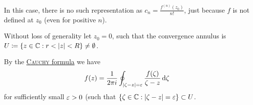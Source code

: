 \documentclass[a4paper,english]{article}
\begin{document}
\begin{remark}
    In this case, there is no such representation as $c_n = \frac{f^{(n)}(z_0)}{n!}$, just because $f$ is not defined at $z_0$ (even for positive $n$).
\end{remark}

\begin{pr}
    Without loss of generality let $z_0 = 0$, such that the convergence annulus is $U \coloneqq \{ z \in \operatorname{\mathbb{C}}: r < | z | < R\} \ne \emptyset$.
    
    By the \hyperref[th:formula]{\textsc{Cauchy} formula} we have
    \begin{equation*}
        f(z)
        = \frac{1}{2 \pi i} \oint_{| \zeta - z | = \varepsilon} \frac{f(\zeta)}{\zeta - z} \mathop{}\!\mathrm{d}{\zeta}
    \end{equation*}
    for sufficiently small $\varepsilon > 0$ (such that $\{ \zeta \in \operatorname{\mathbb{C}}: | \zeta - z | = \varepsilon \} \subset U$.
    

\end{pr}
\end{document}
